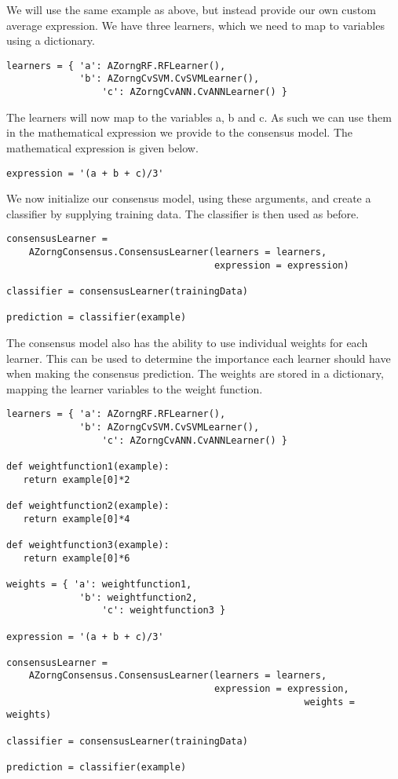 \documentclass[12pt]{article}
\begin{document}
We will use the same example as above, but instead provide our own custom 
average expression. We have three learners, which we need to map to variables
using a dictionary.

\begin{verbatim}
learners = { 'a': AZorngRF.RFLearner(), 
             'b': AZorngCvSVM.CvSVMLearner(),
	             'c': AZorngCvANN.CvANNLearner() }
\end{verbatim}

The learners will now map to the variables a, b and c. As such we can use them in
the mathematical expression we provide to the consensus model. The mathematical 
expression is given below.

\begin{verbatim}
expression = '(a + b + c)/3'
\end{verbatim}

We now initialize our consensus model, using these arguments, and create a
classifier by supplying training data. The classifier is then used as before.

\begin{verbatim}
consensusLearner = 
    AZorngConsensus.ConsensusLearner(learners = learners, 
                                     expression = expression)

classifier = consensusLearner(trainingData)

prediction = classifier(example)
\end{verbatim}

The consensus model also has the ability to use individual weights for each learner.
This can be used to determine the importance each learner should have when making
the consensus prediction. The weights are stored in a dictionary, mapping the 
learner variables to the weight function. 

\begin{verbatim}
learners = { 'a': AZorngRF.RFLearner(), 
             'b': AZorngCvSVM.CvSVMLearner(),
	             'c': AZorngCvANN.CvANNLearner() }

def weightfunction1(example):
   return example[0]*2

def weightfunction2(example):
   return example[0]*4

def weightfunction3(example):
   return example[0]*6

weights = { 'a': weightfunction1, 
             'b': weightfunction2,
	             'c': weightfunction3 }

expression = '(a + b + c)/3'

consensusLearner = 
    AZorngConsensus.ConsensusLearner(learners = learners, 
                                     expression = expression,
				                                     weights = weights)

classifier = consensusLearner(trainingData)

prediction = classifier(example)
\end{verbatim}
\end{document}
